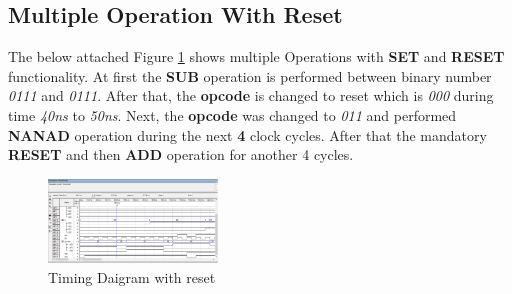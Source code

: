 \subsection{Multiple Operation With Reset}\label{subsec:multiple-operation-with-reset}
The below attached Figure \ref{fig:multiple operation} shows multiple Operations with \textbf{SET} and \textbf{RESET} functionality.
At first the \textbf{SUB} operation is performed between binary number \textit{0111} and \textit{0111}.
After that, the \textbf{opcode} is changed to reset which is \textit{000} during time \textit{40ns} to \textit{50ns}.
Next, the \textbf{opcode} was changed to \textit{011} and performed \textbf{NANAD} operation during the next \textbf{4} clock cycles.
After that the mandatory \textbf{RESET} and then \textbf{ADD} operation for another 4 cycles.
\begin{figure}[H]
    \begin{center}
        \includegraphics[width = 0.4\textwidth]{figures/three_operation_together_sub_nand_add_with_reset}
    \end{center}
    \caption{Timing Daigram with reset}
    \label{fig:multiple operation}
\end{figure}

